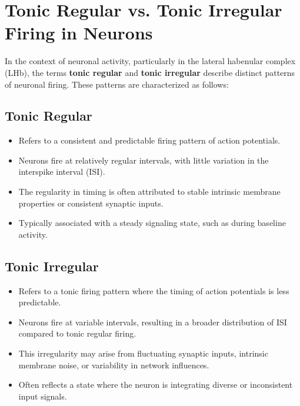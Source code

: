 \documentclass[a4paper,9pt]{extarticle}
\begin{document}
\section{Tonic Regular vs. Tonic Irregular Firing in Neurons}

In the context of neuronal activity, particularly in the lateral habenular complex (LHb), the terms \textbf{tonic regular} and \textbf{tonic irregular} describe distinct patterns of neuronal firing. These patterns are characterized as follows:

\subsection{Tonic Regular}
\begin{itemize}
    \item Refers to a consistent and predictable firing pattern of action potentials.
    \item Neurons fire at relatively regular intervals, with little variation in the interspike interval (ISI).
    \item The regularity in timing is often attributed to stable intrinsic membrane properties or consistent synaptic inputs.
    \item Typically associated with a steady signaling state, such as during baseline activity.
\end{itemize}

\subsection{Tonic Irregular}
\begin{itemize}
    \item Refers to a tonic firing pattern where the timing of action potentials is less predictable.
    \item Neurons fire at variable intervals, resulting in a broader distribution of ISI compared to tonic regular firing.
    \item This irregularity may arise from fluctuating synaptic inputs, intrinsic membrane noise, or variability in network influences.
    \item Often reflects a state where the neuron is integrating diverse or inconsistent input signals.
\end{itemize}
\end{document}
